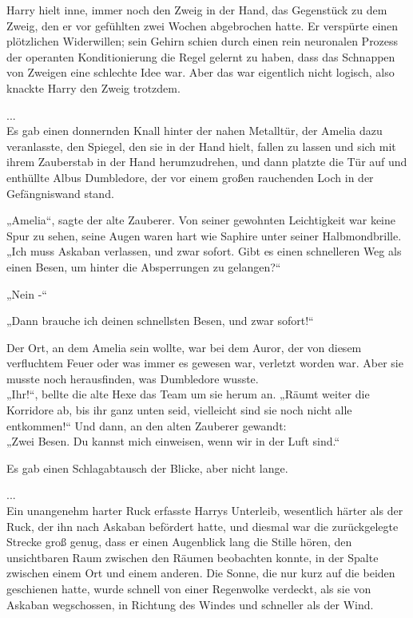 {Harry hielt inne, immer noch den Zweig in der Hand, das Gegenstück zu dem Zweig, den er vor gefühlten zwei Wochen abgebrochen hatte. Er verspürte einen plötzlichen Widerwillen; sein Gehirn schien durch einen rein neuronalen Prozess der operanten Konditionierung die Regel gelernt zu haben, dass das Schnappen von Zweigen eine schlechte Idee war. Aber das war eigentlich nicht logisch, also knackte Harry den Zweig trotzdem.

...\\ Es gab einen donnernden Knall hinter der nahen Metalltür, der Amelia dazu veranlasste, den Spiegel, den sie in der Hand hielt, fallen zu lassen und sich mit ihrem Zauberstab in der Hand herumzudrehen, und dann platzte die Tür auf und enthüllte Albus Dumbledore, der vor einem großen rauchenden Loch in der Gefängniswand stand.

„Amelia“, sagte der alte Zauberer. Von seiner gewohnten Leichtigkeit war keine Spur zu sehen, seine Augen waren hart wie Saphire unter seiner Halbmondbrille. „Ich muss Askaban verlassen, und zwar sofort. Gibt es einen schnelleren Weg als einen Besen, um hinter die Absperrungen zu gelangen?“

„Nein -“

„Dann brauche ich deinen schnellsten Besen, und zwar sofort!“

Der Ort, an dem Amelia sein wollte, war bei dem Auror, der von diesem verfluchtem Feuer oder was immer es gewesen war, verletzt worden war. Aber sie musste noch herausfinden, was Dumbledore wusste.\\ „Ihr!“, bellte die alte Hexe das Team um sie herum an. „Räumt weiter die Korridore ab, bis ihr ganz unten seid, vielleicht sind sie noch nicht alle entkommen!“ Und dann, an den alten Zauberer gewandt:\\ „Zwei Besen. Du kannst mich einweisen, wenn wir in der Luft sind.“

Es gab einen Schlagabtausch der Blicke, aber nicht lange.

...\\ Ein unangenehm harter Ruck erfasste Harrys Unterleib, wesentlich härter als der Ruck, der ihn nach Askaban befördert hatte, und diesmal war die zurückgelegte Strecke groß genug, dass er einen Augenblick lang die Stille hören, den unsichtbaren Raum zwischen den Räumen beobachten konnte, in der Spalte zwischen einem Ort und einem anderen. Die Sonne, die nur kurz auf die beiden geschienen hatte, wurde schnell von einer Regenwolke verdeckt, als sie von Askaban wegschossen, in Richtung des Windes und schneller als der Wind.

}
